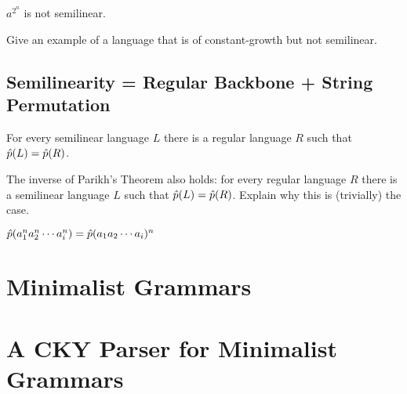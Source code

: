 \begin{corollary}
    $a^{2^n}$ is not semilinear.
\end{corollary}

\begin{exercise}
    Give an example of a language that is of constant-growth but not semilinear.
\end{exercise}

\subsection{Semilinearity = Regular Backbone + String Permutation}

\begin{theorem}
    For every semilinear language $L$ there is a regular language $R$ such that $\hat{p}(L) = \hat{p}(R)$.
\end{theorem}
%
\begin{exercise}
    The inverse of Parikh's Theorem also holds: for every regular language $R$ there is a semilinear language $L$ such that $\hat{p}(L) = \hat{p}(R)$.
    Explain why this is (trivially) the case.
\end{exercise}

$\hat{p}(a_1^n a_2^n \cdots a_i^n) = \hat{p}(a_1 a_2 \cdots a_i)^n$

\section{Minimalist Grammars}

\section{A CKY Parser for Minimalist Grammars}

